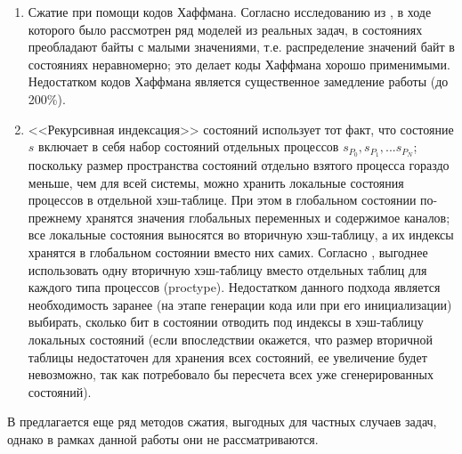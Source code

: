 \begin{enumerate}
\item Сжатие при помощи кодов Хаффмана. Согласно исследованию из
  \cite{StateCompr}, в ходе которого было рассмотрен ряд моделей из
  реальных задач, в состояниях преобладают байты с малыми значениями,
  т.е. распределение значений байт в состояниях неравномерно; это
  делает коды Хаффмана хорошо применимыми. Недостатком кодов Хаффмана
  является существенное замедление работы (до 200\%).

\item <<Рекурсивная индексация>> состояний использует тот факт, что
  состояние $s$ включает в себя набор состояний отдельных процессов
  $s_{P_0}, s_{P_1}, ... s_{P_N}$; поскольку размер пространства состояний
  отдельно взятого процесса гораздо меньше, чем для всей системы,
  можно хранить локальные состояния процессов в отдельной
  хэш-таблице. При этом в глобальном состоянии по-прежнему хранятся
  значения глобальных переменных и содержимое каналов; все локальные
  состояния выносятся во вторичную хэш-таблицу, а их индексы хранятся
  в глобальном состоянии вместо них самих. Согласно \cite{StateCompr},
  выгоднее использовать одну вторичную хэш-таблицу вместо отдельных
  таблиц для каждого типа процессов (proctype). Недостатком данного
  подхода является необходимость заранее (на этапе генерации кода или
  при его инициализации) выбирать, сколько бит в состоянии отводить
  под индексы в хэш-таблицу локальных состояний (если впоследствии
  окажется, что размер вторичной таблицы недостаточен для хранения
  всех состояний, ее увеличение будет невозможно, так как потребовало
  бы пересчета всех уже сгенерированных состояний).
\end{enumerate}

В \cite{StateCompr} предлагается еще ряд методов сжатия, выгодных для
частных случаев задач, однако в рамках данной работы они не
рассматриваются. 

